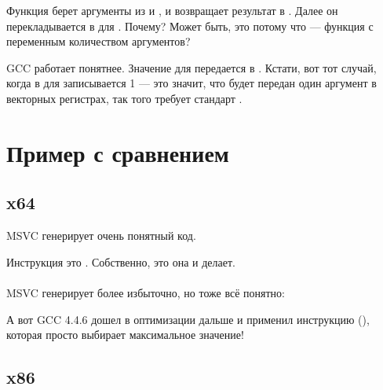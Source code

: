 Функция  берет аргументы из  и , 
и возвращает результат в .
Далее он перекладывается в \RDX для \printf. 
Почему? 
Может быть, это потому что 
\printf --- функция с переменным количеством аргументов?



GCC работает понятнее. 
Значение для \printf передается в . 
Кстати, вот тот случай, когда в \EAX
для \printf записывается 1 --- это значит, что будет передан один аргумент в векторных регистрах, 
так того требует стандарт \SysVABI.

\section{Пример с сравнением}



\subsection{x64}



\Optimizing MSVC генерирует очень понятный код.

Инструкция  это . Собственно, это она и делает.\\
\\
\NonOptimizing MSVC генерирует более избыточно, но тоже всё понятно:



А вот GCC 4.4.6 дошел в оптимизации дальше и применил инструкцию  (), которая просто выбирает максимальное значение!



\clearpage
\subsection{x86}


